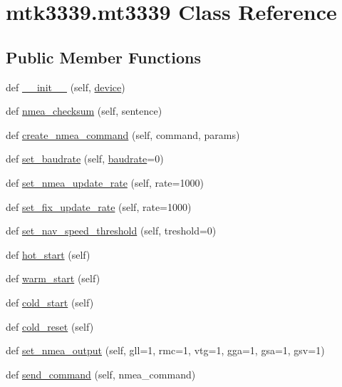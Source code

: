 \hypertarget{classmtk3339_1_1mt3339}{}\section{mtk3339.\+mt3339 Class Reference}
\label{classmtk3339_1_1mt3339}
\subsection*{Public Member Functions}
\begin{DoxyCompactItemize}
\item 
def \hyperlink{classmtk3339_1_1mt3339_a90c8bc08b1a156c6c19c26bdc77c7c02}{\+\_\+\+\_\+init\+\_\+\+\_\+} (self, \hyperlink{classmtk3339_1_1mt3339_ad145a16c44025fed544f64875138fbeb}{device})
\item 
def \hyperlink{classmtk3339_1_1mt3339_a6bc800f643eb859cd9281a7d181635af}{nmea\+\_\+checksum} (self, sentence)
\item 
def \hyperlink{classmtk3339_1_1mt3339_a414f7b3561999f7b340eaf07b5324096}{create\+\_\+nmea\+\_\+command} (self, command, params)
\item 
def \hyperlink{classmtk3339_1_1mt3339_a949c3f97a36cd573a5db84498d6a918c}{set\+\_\+baudrate} (self, \hyperlink{classmtk3339_1_1mt3339_a9f084ef94ab48f0d86620b1ff6e149e1}{baudrate}=0)
\item 
def \hyperlink{classmtk3339_1_1mt3339_a1e0e795ac59566e0fbe37944869fb40d}{set\+\_\+nmea\+\_\+update\+\_\+rate} (self, rate=1000)
\item 
def \hyperlink{classmtk3339_1_1mt3339_a19f72767a99406ec267c5024d4f5f671}{set\+\_\+fix\+\_\+update\+\_\+rate} (self, rate=1000)
\item 
def \hyperlink{classmtk3339_1_1mt3339_ae6d1513233a559eddb7d95dff70551d1}{set\+\_\+nav\+\_\+speed\+\_\+threshold} (self, treshold=0)
\item 
def \hyperlink{classmtk3339_1_1mt3339_ab257079379bc391ec80e5f96d5345799}{hot\+\_\+start} (self)
\item 
def \hyperlink{classmtk3339_1_1mt3339_a742403d0960fa0169b46fe2fc58516f0}{warm\+\_\+start} (self)
\item 
def \hyperlink{classmtk3339_1_1mt3339_a9104604037d26f690817214a8193e5b5}{cold\+\_\+start} (self)
\item 
def \hyperlink{classmtk3339_1_1mt3339_adee0951085b68b3359945a918f906d8c}{cold\+\_\+reset} (self)
\item 
def \hyperlink{classmtk3339_1_1mt3339_a88e41d5dc6557198a3c97200236b0ae5}{set\+\_\+nmea\+\_\+output} (self, gll=1, rmc=1, vtg=1, gga=1, gsa=1, gsv=1)
\item 
def \hyperlink{classmtk3339_1_1mt3339_a46e9f145172ed2c4ae02e4710f7673bf}{send\+\_\+command} (self, nmea\+\_\+command)
\end{DoxyCompactItemize}
